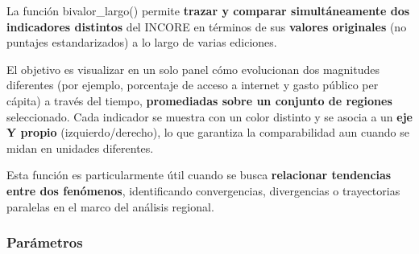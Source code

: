 \documentclass[
  11pt,
  letterpaper,
  DIV=11,
  numbers=noendperiod]{scrartcl}
\begin{document}
La función bivalor\_largo() permite \textbf{trazar y comparar
simultáneamente dos indicadores distintos} del INCORE en términos de sus
\textbf{valores originales} (no puntajes estandarizados) a lo largo de
varias ediciones.

El objetivo es visualizar en un solo panel cómo evolucionan dos
magnitudes diferentes (por ejemplo, porcentaje de acceso a internet y
gasto público per cápita) a través del tiempo, \textbf{promediadas sobre
un conjunto de regiones} seleccionado. Cada indicador se muestra con un
color distinto y se asocia a un \textbf{eje Y propio}
(izquierdo/derecho), lo que garantiza la comparabilidad aun cuando se
midan en unidades diferentes.

Esta función es particularmente útil cuando se busca \textbf{relacionar
tendencias entre dos fenómenos}, identificando convergencias,
divergencias o trayectorias paralelas en el marco del análisis regional.

\subsubsection{\texorpdfstring{\textbf{Parámetros}}{Parámetros}}\label{paruxe1metros-11}
\end{document}
